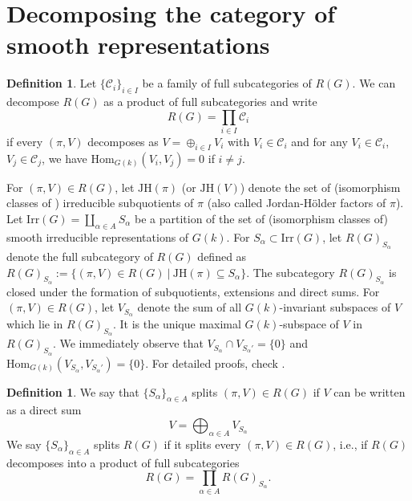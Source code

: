 \documentclass[11 pt]{article}
\numberwithin{equation}{subsection}
\theoremstyle{definition}
\newtheorem{definition}[theorem]{Definition}
\theoremstyle{remark}
\theoremstyle{conjecture}
\newcommand{\Irr}{\mathrm{Irr}}
\newcommand{\JH}{\mathrm{JH}}
\begin{document}
\section{Decomposing the category of smooth representations}\label{section:decomposition}
\begin{definition}
    Let $\{\mathscr C_i\}_{i\in I}$ be a family of full subcategories of $R(G)$. We can decompose $R(G)$ as a product of full subcategories and write 
    \begin{equation*}
        R(G) = \prod_{i\in I} \mathscr C_i
    \end{equation*}
    if every $(\pi, V)$ decomposes as $V = \oplus_{i\in I}V_i$ with $V_i \in \mathscr C_i$ and for any $V_i \in \mathscr C_i$, $V_j \in \mathscr C_j$, we have $\mathrm{Hom}_{G(k)}(V_i,V_j)= 0$ if $i \neq j$.
\end{definition}
For $(\pi,V) \in R(G)$, let $\JH(\pi)$ (or $\JH(V)$) denote the set of (isomorphism classes of ) irreducible subquotients of $\pi$ (also called Jordan-H\"older factors of $\pi$). Let $\Irr(G) = \coprod_{\alpha \in A} S_\alpha$ be a partition of the set of (isomorphism classes of) smooth irreducible representations of $G(k)$. For $S_\alpha \subset \Irr(G)$, let $R(G)_{S_\alpha} $ denote the full subcategory of $R(G)$ defined as  $R(G)_{S_\alpha} := \{ (\pi,V)\in R(G)\:|\: \JH(\pi) \subseteq S_\alpha\}$. The subcategory $R(G)_{S_\alpha}$ is closed under the formation of subquotients, extensions and direct sums. For $(\pi, V)\in R(G)$, let $V_{S_\alpha}$ denote the sum of all $G(k)$-invariant subspaces of $V$ which lie in $R(G)_{S_\alpha}$. It is the unique maximal $G(k)$-subspace of $V$ in $R(G)_{S_\alpha}$. We immediately observe that $V_{S_\alpha} \cap V_{S_\alpha'}=\{0\}$ and $\mathrm{Hom}_{G(k)}(V_{S_\alpha},V_{S_\alpha'})=\{0\}$. For detailed proofs, check \cite[Section 16]{heyer2023smooth}.

\begin{definition}
   We say that $\{S_\alpha\}_{\alpha\in A}$ splits $(\pi,V)\in R(G)$ if $V$ can be written as a direct sum 
   \begin{equation*}
       V = \bigoplus_{\alpha \in A} V_{S_\alpha}
   \end{equation*}
   We say $\{S_\alpha\}_{\alpha\in A}$ splits $R(G)$ if it splits every $(\pi,V) \in R(G)$, i.e., if $R(G)$ decomposes into a product of full subcategories 
   \begin{equation*}
      R(G)= \prod_{\alpha \in A} R(G)_{S_\alpha}.
   \end{equation*}
\end{definition}
\end{document}
